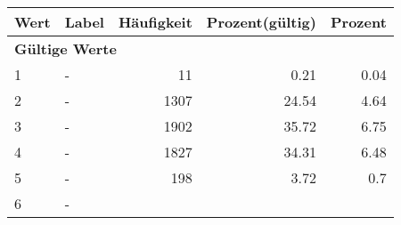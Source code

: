      \begin{longtable}{lXrrr}
     \toprule
     \textbf{Wert} & \textbf{Label} & \textbf{Häufigkeit} & \textbf{Prozent(gültig)} & \textbf{Prozent} \\
     \endhead
     \midrule
     \multicolumn{5}{l}{\textbf{Gültige Werte}}\\

     1 &
     \multicolumn{1}{X}{ -  } &


       \num{11} &
       \num[round-mode=places,round-precision=2]{0.21} &
         \num[round-mode=places,round-precision=2]{0.04} \\

     2 &
     \multicolumn{1}{X}{ -  } &


       \num{1307} &
       \num[round-mode=places,round-precision=2]{24.54} &
         \num[round-mode=places,round-precision=2]{4.64} \\

     3 &
     \multicolumn{1}{X}{ -  } &


       \num{1902} &
       \num[round-mode=places,round-precision=2]{35.72} &
         \num[round-mode=places,round-precision=2]{6.75} \\

     4 &
     \multicolumn{1}{X}{ -  } &


       \num{1827} &
       \num[round-mode=places,round-precision=2]{34.31} &
         \num[round-mode=places,round-precision=2]{6.48} \\

     5 &
     \multicolumn{1}{X}{ -  } &


       \num{198} &
       \num[round-mode=places,round-precision=2]{3.72} &
         \num[round-mode=places,round-precision=2]{0.7} \\

     6 &
     \multicolumn{1}{X}{ -  } &



\end{longtable}
